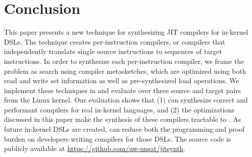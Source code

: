 \section{Conclusion}\label{s:conclusion}
This paper presents a new technique for synthesizing JIT compilers for in-kernel
DSLs. The technique creates per-instruction compilers, or compilers that
independently translate single source instructions to sequences of target
instructions. In order to synthesize each per-instruction compiler, we frame the
problem as search using compiler metasketches, which are optimized using both
read and write set information as well as pre-synthesized load operations. We
implement these techniques in \jitsynth and evaluate \jitsynth over three source
and target pairs from the Linux kernel. Our evaluation shows that (1) \jitsynth
can synthesize correct and performant compilers for real in-kernel languages,
and (2) the optimizations discussed in this paper make the synthesis of these
compilers tractable to \jitsynth. As future in-kernel DSLs are created,
\jitsynth can reduce both the programming and proof burden on developers writing
compilers for those DSLs. The \jitsynth source code is publicly available at
\url{https://github.com/uw-unsat/jitsynth}.
